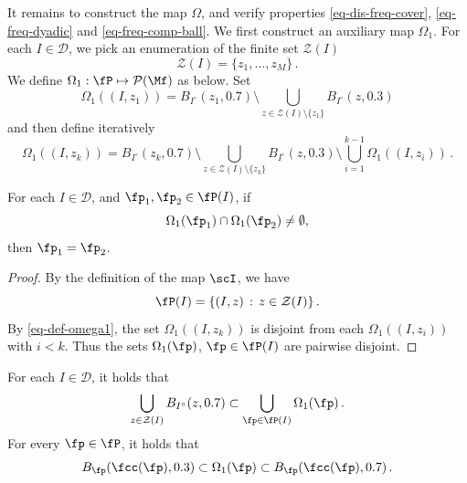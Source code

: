 It remains to construct the map $\Omega$, and verify properties \eqref{eq-dis-freq-cover}, \eqref{eq-freq-dyadic} and
\eqref{eq-freq-comp-ball}. We first construct an auxiliary map $\Omega_1$. For each $I \in \mathcal{D}$, we pick an enumeration of the finite set $\mathcal{Z}(I)$
$$
    \mathcal{Z}(I) = \{z_1, \dotsc, z_M\}\,.
$$
We define {$\Omega_1:\fP \mapsto \mathcal{P}(\Mf) $ as below}. Set
$$
    \Omega_1((I, z_1)) = B_{I^\circ}(z_1, 0.7) \setminus \bigcup_{z \in \mathcal{Z}(I)\setminus \{z_1\}} B_{I^\circ}(z, 0.3)
$$
and then define iteratively
\begin{equation}
    \label{eq-def-omega1}
    \Omega_1((I, z_k)) = B_{I^\circ}(z_k, 0.7) \setminus \bigcup_{z \in \mathcal{Z}(I) \setminus \{z_k\}} B_{I^\circ}(z, 0.3) \setminus \bigcup_{i=1}^{k-1} \Omega_1((I, z_i))\,.
\end{equation}
\begin{lemma}
    \label{disjoint-frequency-cubes}
    \leanok
    For each $I \in \mathcal{D}$, and $\fp_1, \fp_2\in \fP(I)$,
    if $$\Omega_1(\fp_1)\cap \Omega_1(\fp_2)\neq \emptyset,$$ then $\fp_1=\fp_2$.
\end{lemma}

\begin{proof}
    \leanok
    By the definition of the map $\scI$, we have
    $$
        \fP(I) = \{(I, z) \, : \, z \in \mathcal{Z}(I)\}\,.
    $$
    By \eqref{eq-def-omega1}, the set $\Omega_1((I, z_k))$ is disjoint from each $\Omega_1((I, z_i))$ with $i < k$. Thus the sets $\Omega_1(\fp)$, $\fp \in \fP(I)$ are pairwise disjoint.
\end{proof}

\begin{lemma}
    \label{frequency-cube-cover}
    \leanok
    For each $I \in \mathcal{D}$, it holds that
    \begin{equation}
    \label{eq-omega1-cover}
            \bigcup_{z \in \mathcal{Z}(I)} B_{I^\circ}(z, 0.7)\subset \bigcup_{\fp \in \fP(I)} \Omega_1(\fp)\,.
    \end{equation}
    For every $\fp \in \fP$, it holds that
    \begin{equation}
        \label{eq-omega1-incl}
        B_{\fp}(\fcc(\fp), 0.3) \subset \Omega_1(\fp) \subset B_{\fp}(\fcc(\fp), 0.7)\,.
    \end{equation}
\end{lemma}

